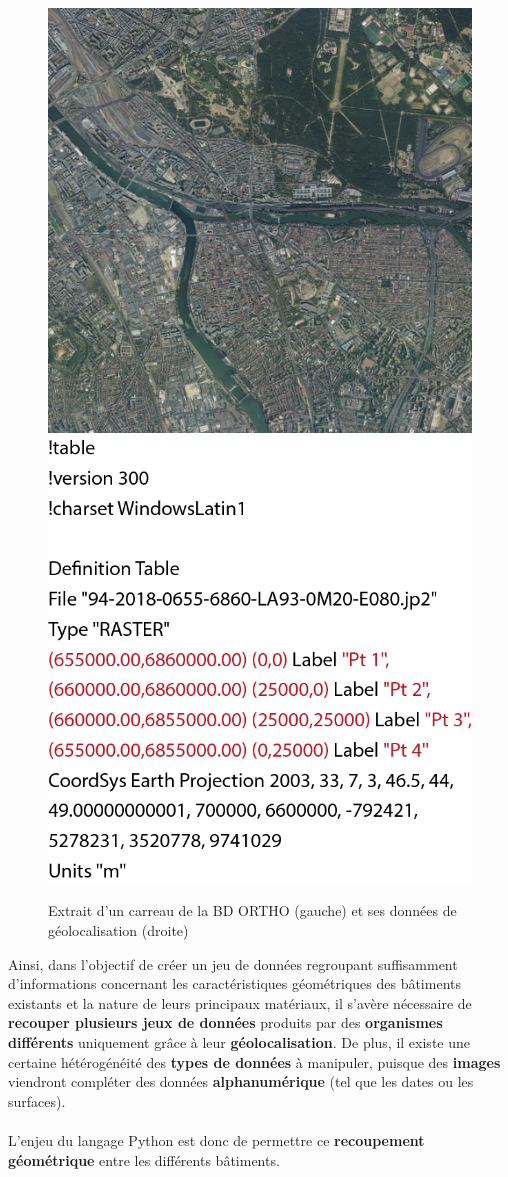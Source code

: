 \documentclass[
  11pt,
  french,
]{article}
\begin{document}
\begin{tcolorbox}
\begin{figure}

{\centering \includegraphics[width=0.45\linewidth]{__imgs/bd_ortho_img} \includegraphics[width=0.45\linewidth]{__imgs/bd_ortho} 

}

\caption[Extrait d'un carreau de la BD ORTHO (gauche) et ses données de géolocalisation (droite)  -  \url{https://geoservices.ign.fr/}]{Extrait d'un carreau de la BD ORTHO (gauche) et ses données de géolocalisation (droite)}\label{fig:bd_ortho}
\end{figure}
\end{tcolorbox}

\hfill\break
\hfill\break
Ainsi, dans l'objectif de créer un jeu de données regroupant
suffisamment d'informations concernant les caractéristiques géométriques
des bâtiments existants et la nature de leurs principaux matériaux, il
s'avère nécessaire de \textbf{recouper plusieurs jeux de données}
produits par des \textbf{organismes différents} uniquement grâce à leur
\textbf{géolocalisation}. De plus, il existe une certaine hétérogénéité
des \textbf{types de données} à manipuler, puisque des \textbf{images}
viendront compléter des données \textbf{alphanumérique} (tel que les
dates ou les surfaces).\\
~\\
L'enjeu du langage Python est donc de permettre ce \textbf{recoupement
géométrique} entre les différents bâtiments.
\end{document}
